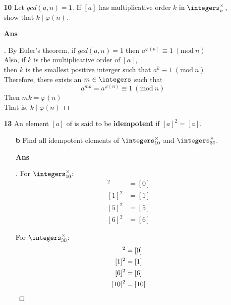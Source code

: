 \documentclass[paper=usletter, fontsize=12pt]{article}
\newcommand{\Mod}[1]{\ (\mathrm{mod}\ #1)}
\begin{document}
\begin{itemize}
\begin{itemize}
            \item[\textbf{10}] Let $gcd(a, n)=1$. If $[a]$ has multiplicative
            order $k$ in $\integers_n^\times$, show that $k \mid \varphi(n)$.
            \item[\textbf{Ans}]
            \begin{proof}[\unskip\nopunct]
                By Euler's theorem, if $gcd(a, n)=1$ then $a^{\varphi(n)}
                \equiv 1 \Mod{n}$\\
                Also, if $k$ is the multiplicative order of $[a]$, \\
                then $k$ is the smallest positive interger such that $a^k \equiv 1 \Mod{n}$\\
                Therefore, there exists an $m \in \integers$ such that
                \begin{equation*}
                    a^{mk} = a^{\varphi(n)} \equiv 1 \Mod{n}
                \end{equation*}
                Then $mk = \varphi(n)$\\
                That is, $k \mid \varphi(n)$ \qedhere
            \end{proof}
            \vspace{0.2in}

            \item[\textbf{13}] An element $[a]$ of is said to be
            \textbf{idempotent} if $[a]^2=[a]$.
            \begin{itemize}

                \item[\textbf{b}] Find all idempotent elements of
                $\integers_{10}^\times$ and $\integers_{30}^\times$.
                \item[\textbf{Ans}]
                \begin{proof}[\unskip\nopunct]
                    For $\integers_{10}^\times$:
                    \begin{align*}
                        [0]^2 & = [0]\\
                        [1]^2 & = [1]\\
                        [5]^2 & = [5]\\
                        [6]^2 & = [6]
                    \end{align*}

                    For $\integers_{30}^\times$:
                    \begin{align*}
                        [0]^2 & = [0]\\
                        [1]^2 & = [1]\\
                        [6]^2 & = [6]\\
                        [10]^2 & = [10] \qedhere
                    \end{align*}


\end{proof}
\end{itemize}
\end{itemize}
\end{itemize}
\end{document}
